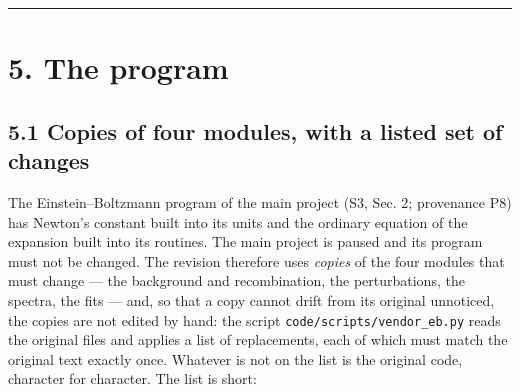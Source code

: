 \documentclass[
  10pt,
]{article}
\begin{document}
\begin{center}\rule{0.5\linewidth}{0.5pt}\end{center}

\hypertarget{the-program}{%
\section{5. The program}\label{the-program}}

\hypertarget{copies-of-four-modules-with-a-listed-set-of-changes}{%
\subsection{5.1 Copies of four modules, with a listed set of
changes}\label{copies-of-four-modules-with-a-listed-set-of-changes}}

The Einstein--Boltzmann program of the main project (S3, Sec. 2;
provenance P8) has Newton's constant built into its units and the
ordinary equation of the expansion built into its routines. The main
project is paused and its program must not be changed. The revision
therefore uses \emph{copies} of the four modules that must change ---
the background and recombination, the perturbations, the spectra, the
fits --- and, so that a copy cannot drift from its original unnoticed,
the copies are not edited by hand: the script
\texttt{code/scripts/vendor\_eb.py} reads the original files and applies
a list of replacements, each of which must match the original text
exactly once. Whatever is not on the list is the original code,
character for character. The list is short:
\end{document}
